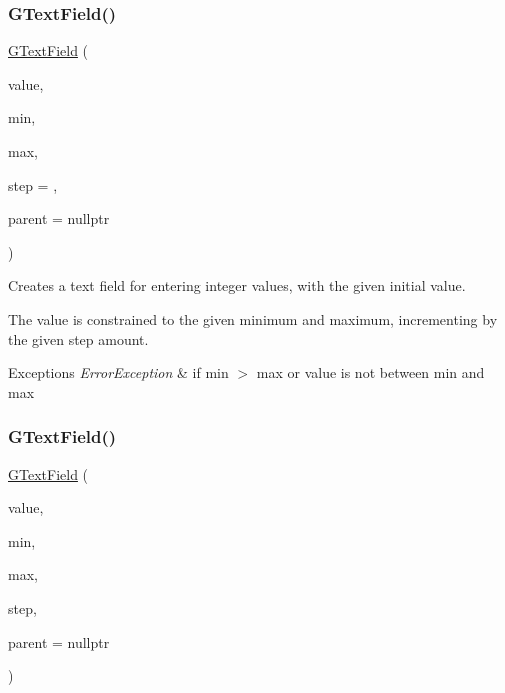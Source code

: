 \subsubsection{\texorpdfstring{G\+Text\+Field()}{GTextField()}\hspace{0.1cm}{\footnotesize\ttfamily [3/4]}}
{\footnotesize\ttfamily \mbox{\hyperlink{classGTextField}{G\+Text\+Field}} (\begin{DoxyParamCaption}\item[{int}]{value,  }\item[{int}]{min,  }\item[{int}]{max,  }\item[{int}]{step = {},  }\item[{Q\+Widget $\ast$}]{parent = {\ttfamily nullptr} }\end{DoxyParamCaption})}



Creates a text field for entering integer values, with the given initial value. 

The value is constrained to the given minimum and maximum, incrementing by the given step amount. 
\begin{DoxyExceptions}{Exceptions}
{\em Error\+Exception} & if min $>$ max or value is not between min and max \\
\hline
\end{DoxyExceptions}
\mbox{\label{classGTextField_a8d164bf18d4dd4da6d5af0d23ee3a2c8}} 
\subsubsection{\texorpdfstring{G\+Text\+Field()}{GTextField()}\hspace{0.1cm}{\footnotesize\ttfamily [4/4]}}
{\footnotesize\ttfamily \mbox{\hyperlink{classGTextField}{G\+Text\+Field}} (\begin{DoxyParamCaption}\item[{double}]{value,  }\item[{double}]{min,  }\item[{double}]{max,  }\item[{double}]{step,  }\item[{Q\+Widget $\ast$}]{parent = {\ttfamily nullptr} }\end{DoxyParamCaption})}



